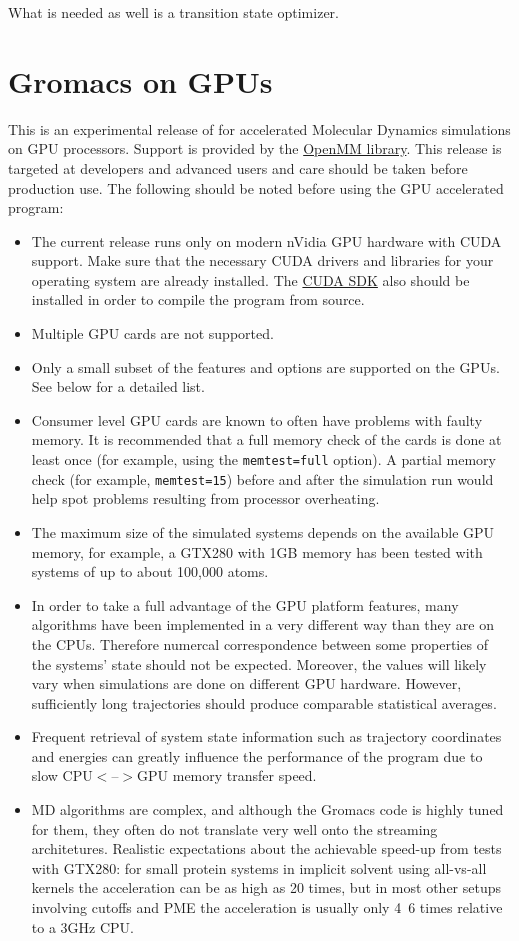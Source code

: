 What is needed as well is a transition state optimizer.

\section{Gromacs on GPUs}

This is an experimental release of {\gromacs} for accelerated
Molecular Dynamics simulations on GPU processors. Support is provided
by the \href{https://simtk.org/home/openmm}{OpenMM library}. This release is
targeted at developers and advanced users and care should be taken before production use.
The following should be noted before using the GPU accelerated program:
\begin{itemize}
\item The current release runs only on modern nVidia GPU hardware with CUDA support.
Make sure that the necessary CUDA drivers and libraries for your operating system
are already installed. The \href{http://www.nvidia.com/object/cuda_home.html}
{CUDA SDK} also should be installed in order to compile the program from source.
\item Multiple GPU cards are not supported.
\item Only a small subset of the {\gromacs} features and options are supported on the GPUs.
See below for a detailed list.
\item Consumer level GPU cards are known to often have problems with faulty memory.
It is recommended that a full memory check of the cards is done at least once
(for example, using the {\tt memtest=full} option).
A partial memory check (for example, {\tt memtest=15}) before and
after the simulation run would help spot
problems resulting from processor overheating.
\item The maximum size of the simulated systems depends on the available
GPU memory, for example, a GTX280 with 1GB memory has been tested with systems
of up to about 100,000 atoms.
\item In order to take a full advantage of the GPU platform features, many algorithms
have been implemented in a very different way than they are on the CPUs.
Therefore numercal correspondence between some properties of the systems' state
should not be expected. Moreover, the values will likely vary when simulations are
done on different GPU hardware. However, sufficiently long trajectories
should produce comparable statistical averages.
\item Frequent retrieval of system state information such as
trajectory coordinates and energies can greatly influence the performance
of the program due to slow CPU$<$--$>$GPU memory transfer speed.
\item MD algorithms are complex, and although the Gromacs code is highly tuned for them,
they often do not translate very well onto the streaming architetures.
Realistic expectations about the achievable speed-up from tests with GTX280:
for small protein systems in implicit solvent using all-vs-all kernels the acceleration
can be as high as 20 times, but in most other setups involving cutoffs and PME the
acceleration is usually only 4~6 times relative to a 3GHz CPU.
\end{itemize}

